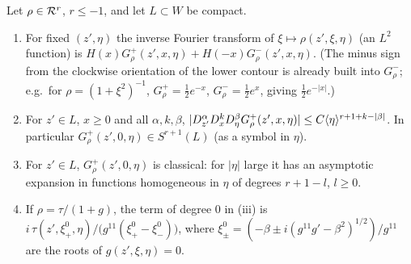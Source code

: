 \begin{lemma}\label{boundary:lem:contour}
Let $\rho\in\mathcal{R}^{r}$, $r\le-1$, and let $L\subset W$ be compact.
\begin{enumerate}[label=(\roman*)]
\item For fixed $(z',\eta)$ the inverse Fourier transform of $\xi\mapsto\rho(z',\xi,
\eta)$ (an $L^2$ function) is $H(x)G^+_\rho(z',x,\eta)+H(-x)G^-_\rho(z',x,\eta)$.
(The minus sign from the clockwise orientation of the lower contour is already built
into $G^-_\rho$; e.g.\ for $\rho=(1+\xi^2)^{-1}$, $G^+_\rho=\tfrac12e^{-x}$, $G^-_\rho=
\tfrac12e^{x}$, giving $\tfrac12e^{-|x|}$.)
\item For $z'\in L$, $x\ge0$ and all $\alpha,k,\beta$,
$|D^\alpha_{z'}D^k_xD^\beta_\eta G^+_\rho(z',x,\eta)|\le C\langle \eta\rangle^{r+1+k-|\beta|}$.
In particular $G^+_\rho(z',0,\eta)\in S^{r+1}(L)$ (as a symbol in $\eta$).
\item For $z'\in L$, $G^+_\rho(z',0,\eta)$ is classical: for $|\eta|$ large it has an
asymptotic expansion in functions homogeneous in $\eta$ of degrees $r+1-l$, $l\ge0$.
\item If $\rho=\tau/(1+g)$, the term of degree $0$ in (iii) is
$i\,\tau(z',\xi^0_+,\eta)/\big(g^{11}(\xi^0_+-\xi^0_-)\big)$, where $\xi^0_\pm=
(-\beta\pm i(g^{11}g'-\beta^2)^{1/2})/g^{11}$ are the roots of $g(z',\xi,\eta)=0$.
\end{enumerate}
\end{lemma}
